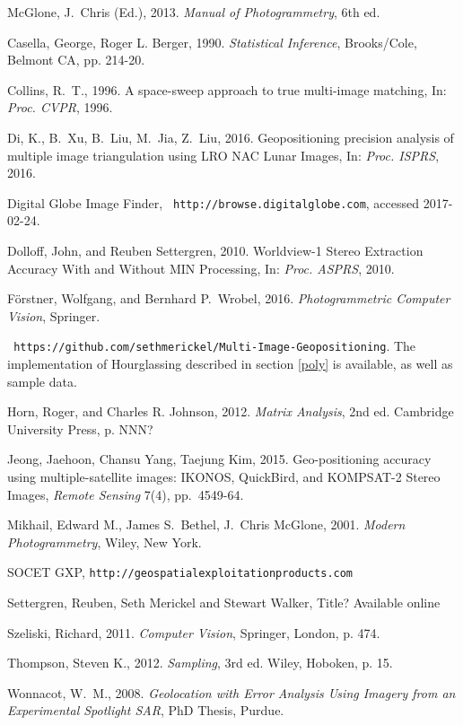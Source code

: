 \documentclass[10pt]{amsart}
\begin{document}
\begin{thebibliography}{99} %

McGlone, J.~Chris (Ed.), 2013. {\em Manual of Photogrammetry},
  6th ed.

 Casella, George, Roger L. Berger, 1990. {\em Statistical
  Inference}, Brooks/Cole, Belmont CA, pp. 214-20.

Collins, R.~T., 1996. A space-sweep approach to true
  multi-image matching, In: {\em Proc. CVPR}, 1996.

Di, K., B.~Xu, B.~Liu, M.~Jia, Z.~Liu, 2016. Geopositioning
  precision analysis of multiple image triangulation using LRO NAC Lunar
  Images, In: {\em Proc. ISPRS}, 2016.

Digital Globe Image Finder, {\tt
  http://browse.digitalglobe.com}, accessed 2017-02-24.

Dolloff, John, and Reuben Settergren, 2010. Worldview-1 Stereo
  Extraction Accuracy With and Without MIN Processing, In: {\em Proc. ASPRS}, 2010.

F\"orstner, Wolfgang, and Bernhard P.~Wrobel, 2016. {\em
  Photogrammetric Computer Vision}, Springer.

 {\tt
  https://github.com/sethmerickel/Multi-Image-Geopositioning}. The
  implementation of Hourglassing described in section \ref{poly} is available,
  as well as sample data.

Horn, Roger, and Charles R. Johnson, 2012. {\em Matrix
  Analysis}, 2nd ed. Cambridge University Press, p. NNN?

Jeong, Jaehoon, Chansu Yang, Taejung Kim, 2015. Geo-positioning
  accuracy using multiple-satellite images: IKONOS, QuickBird, and KOMPSAT-2
  Stereo Images, {\em Remote Sensing} 7(4), pp.~4549-64.

Mikhail, Edward M., James S.~Bethel, J.~Chris McGlone,
  2001. {\em Modern Photogrammetry}, Wiley, New York.

SOCET GXP, {\tt http://geospatialexploitationproducts.com}

Settergren, Reuben, Seth Merickel and Stewart Walker, Title?
  Available online \cite{GITHUB}

Szeliski, Richard, 2011. {\em Computer Vision}, Springer,
  London, p. 474.

Thompson, Steven K., 2012. {\em Sampling}, 3rd ed. Wiley, Hoboken,
  p. 15.

Wonnacot, W.~M., 2008. {\em Geolocation with Error Analysis
  Using Imagery from an Experimental Spotlight SAR}, PhD Thesis, Purdue.


\end{thebibliography}
 
\end{document}
